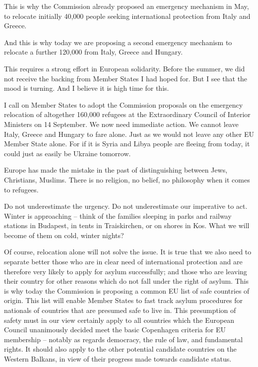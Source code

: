 \documentclass[a4paper,11pt]{article}
\begin{document}
This is why the Commission already proposed an emergency mechanism in May, to relocate initially 40,000 people seeking international protection from Italy and Greece.

And this is why today we are proposing a second emergency mechanism to relocate a further 120,000 from Italy, Greece and Hungary.

This requires a strong effort in European solidarity. Before the summer, we did not receive the backing from Member States I had hoped for. But I see that the mood is turning. And I believe it is high time for this.

I call on Member States to adopt the Commission proposals on the emergency relocation of altogether 160,000 refugees at the Extraordinary Council of Interior Ministers on 14 September. We now need immediate action. We cannot leave Italy, Greece and Hungary to fare alone. Just as we would not leave any other EU Member State alone. For if it is Syria and Libya people are fleeing from today, it could just as easily be Ukraine tomorrow.

Europe has made the mistake in the past of distinguishing between Jews, Christians, Muslims. There is no religion, no belief, no philosophy when it comes to refugees.

Do not underestimate the urgency. Do not underestimate our imperative to act. Winter is approaching – think of the families sleeping in parks and railway stations in Budapest, in tents in Traiskirchen, or on shores in Kos. What we will become of them on cold, winter nights?

Of course, relocation alone will not solve the issue. It is true that we also need to separate better those who are in clear need of international protection and are therefore very likely to apply for asylum successfully; and those who are leaving their country for other reasons which do not fall under the right of asylum. This is why today the Commission is proposing a common EU list of safe countries of origin. This list will enable Member States to fast track asylum procedures for nationals of countries that are presumed safe to live in. This presumption of safety must in our view certainly apply to all countries which the European Council unanimously decided meet the basic Copenhagen criteria for EU membership – notably as regards democracy, the rule of law, and fundamental rights. It should also apply to the other potential candidate countries on the Western Balkans, in view of their progress made towards candidate status.
\end{document}

